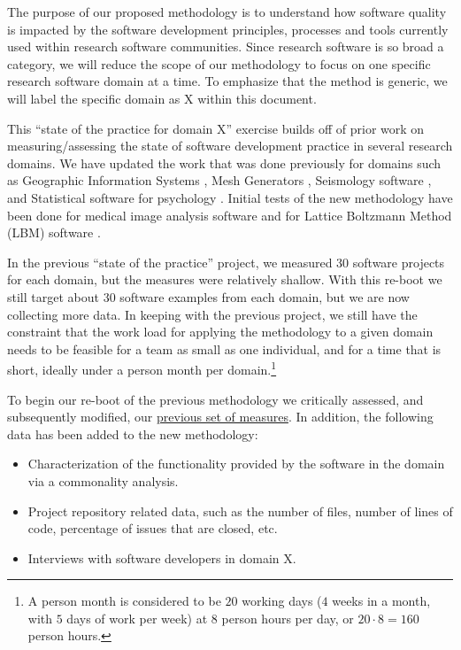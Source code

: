 \documentclass[letterpaper,cleveref]{lipics-v2019}
\begin{document}
The purpose of our proposed methodology is to understand how software quality is
impacted by the software development principles, processes and tools currently
used within research software communities.  Since research software is so broad
a category, we will reduce the scope of our methodology to focus on one specific
research software domain at a time.  To emphasize that the method is generic, we
will label the specific domain as X within this document.  

This ``state of the practice for domain X'' exercise builds off of prior work on
measuring/assessing the state of software development practice in several
research domains.  We have updated the work that was done previously for domains
such as Geographic Information Systems \citep{SmithEtAl2018_arXivGIS}, Mesh
Generators \citep{SmithEtAl2016}, Seismology software \citep{SmithEtAl2018}, and
Statistical software for psychology \citep{SmithEtAl2018_StatSoft}.  Initial
tests of the new methodology have been done for medical image analysis software
\citep{Dong2021} and for Lattice Boltzmann Method (LBM) software
\citep{Michalski2021}.

In the previous ``state of the practice'' project, we measured 30 software
projects for each domain, but the measures were relatively shallow.  With this
re-boot we still target about 30 software examples from each domain, but we are
now collecting more data.  In keeping with the previous project, we still have
the constraint that the work load for applying the methodology to a given domain
needs to be feasible for a team as small as one individual, and for a time that
is short, ideally under a person month per domain.\footnote{A person month is
considered to be $20$ working days ($4$ weeks in a month, with $5$ days of work
per week) at $8$ person hours per day, or $20 \cdot 8 = 160$ person hours.}

To begin our re-boot of the previous methodology we critically assessed, and
subsequently modified, our
\href{https://github.com/adamlazz/DomainX/blob/master/TemplateToGradeSCSoft.pdf}
{previous set of measures}.  In addition, the following data has been added to
the new methodology:

\begin{itemize}
\item Characterization of the functionality provided by the software in the
  domain via a commonality analysis.
\item Project repository related data, such as the number of files, number of
  lines of code, percentage of issues that are closed, etc. 
\item Interviews with software developers in domain X.
\end{itemize}
\end{document}
